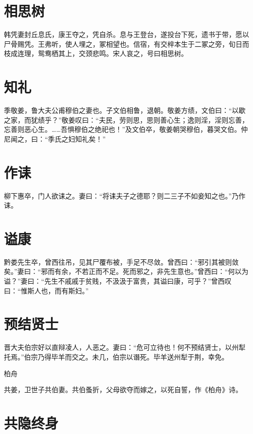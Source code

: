 \documentclass[a4paper,12pt,UTF8,twoside]{ctexbook}
\begin{document}
    \section{相思树}
    
    韩凭妻封丘息氏，康王夺之，凭自杀。息与王登台，遂投台下死，遗书于带，愿以尸骨赐凭。王弗听，使人埋之，冢相望也。信宿，有交梓本生于二冢之旁，旬日而枝成连理，鸳鸯栖其上，交颈悲鸣。宋人哀之，号曰相思树。
    
    \section{知礼}
    
    季敬姜，鲁大夫公甫穆伯之妻也。子文伯相鲁，退朝。敬姜方绩，文伯曰：“以歇之家，而犹绩乎？”敬姜叹曰：“夫民，劳则思，思则善心生；逸则淫，淫则忘善，忘善则恶心生。……吾惧穆伯之绝祀也！”及文伯卒，敬姜朝哭穆伯，暮哭文伯。仲尼闻之，曰：“季氏之妇知礼矣！”
    
    \section{作诔}
    
    柳下惠卒，门人欲诔之。妻曰：“将诔夫子之德耶？则二三子不如妾知之也。”乃作诔。
    
    \section{谥康}
    
    黔娄先生卒，曾西往吊，见其尸覆布被，手足不尽敛。曾西曰：“邪引其被则敛矣。”妻曰：“邪而有余，不若正而不足。死而邪之，非先生意也。”曾西曰：“何以为谥？”妻曰：“先生不戚戚于贫贱，不汲汲于富贵，其谥曰康，可乎？”曾西叹曰：“惟斯人也，而有斯妇。”
    
    \section{预结贤士}
    
    晋大夫伯宗好以直辩凌人，人恶之。妻曰：“危可立待也！何不预结贤士，以州犁托焉。”伯宗乃得毕羊而交之。未几，伯宗以谮死。毕羊送州犁于荆，幸免。
    
    柏舟
    
    共姜，卫世子共伯妻。共伯蚤折，父母欲夺而嫁之，以死自誓，作《柏舟》诗。
    
    \section{共隐终身}
    
\end{document}
